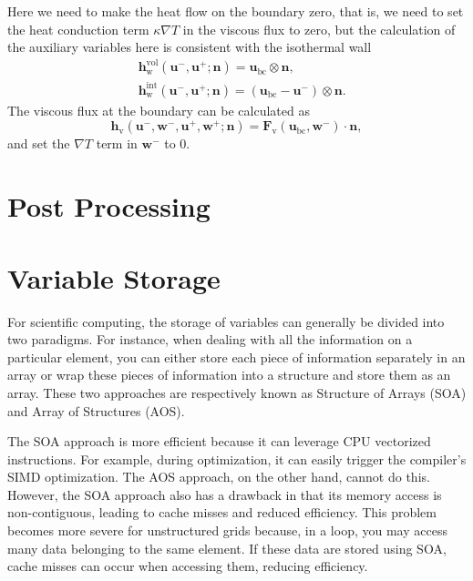 \documentclass{develop-note}
\begin{document}
Here we need to make the heat flow on the boundary zero, that is, we need to set the heat conduction term $\kappa\nabla T$ in the viscous flux to zero, but the calculation of the auxiliary variables here is consistent with the isothermal wall
\begin{equation}
  \begin{aligned}
  &\mathbf{h}^{\mathrm{vol}}_{\mathrm{w}}(\mathbf{u}^{-},\mathbf{u}^{+};\mathbf{n})=\mathbf{u}_{\mathrm{bc}}\otimes\mathbf{n},\\
  &\mathbf{h}^{\mathrm{int}}_{\mathrm{w}}(\mathbf{u}^{-},\mathbf{u}^{+};\mathbf{n})=\left(\mathbf{u}_{\mathrm{bc}}-\mathbf{u}^{-}\right)\otimes\mathbf{n}.
  \end{aligned}
\end{equation}
The viscous flux at the boundary can be calculated as
\begin{equation}
  \mathbf{h}_{\mathrm{v}}(\mathbf{u}^{-},\mathbf{w}^{-},\mathbf{u}^{+},\mathbf{w}^{+};\mathbf{n})=\mathbf{F}_{\mathrm{v}}(\mathbf{u}_{\mathrm{bc}},\mathbf{w}^{-})\cdot\mathbf{n},
\end{equation}
and set the $\nabla T$ term in $\mathbf{w}^{-}$ to 0.

\section{Post Processing}


\section{Variable Storage}


For scientific computing, the storage of variables can generally be divided into two paradigms. For instance, when dealing with all the information on a particular element, you can either store each piece of information separately in an array or wrap these pieces of information into a structure and store them as an array. These two approaches are respectively known as Structure of Arrays (SOA) and Array of Structures (AOS).

The SOA approach is more efficient because it can leverage CPU vectorized instructions. For example, during optimization, it can easily trigger the compiler's SIMD optimization. The AOS approach, on the other hand, cannot do this. However, the SOA approach also has a drawback in that its memory access is non-contiguous, leading to cache misses and reduced efficiency. This problem becomes more severe for unstructured grids because, in a loop, you may access many data belonging to the same element. If these data are stored using SOA, cache misses can occur when accessing them, reducing efficiency.
\end{document}
